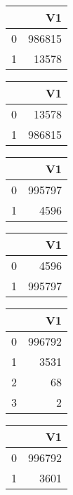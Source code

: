 \bigskip\bigskip
\centering
\begin{tabular}{rr}
  \hline
 & V1 \\ 
  \hline
0 & 986815 \\ 
  1 & 13578 \\ 
   \hline
\end{tabular}

\bigskip\bigskip
\centering
\begin{tabular}{rr}
  \hline
 & V1 \\ 
  \hline
0 & 13578 \\ 
  1 & 986815 \\ 
   \hline
\end{tabular}

\bigskip\bigskip
\centering
\begin{tabular}{rr}
  \hline
 & V1 \\ 
  \hline
0 & 995797 \\ 
  1 & 4596 \\ 
   \hline
\end{tabular}

\bigskip\bigskip
\centering
\begin{tabular}{rr}
  \hline
 & V1 \\ 
  \hline
0 & 4596 \\ 
  1 & 995797 \\ 
   \hline
\end{tabular}

\bigskip\bigskip
\centering
\begin{tabular}{rr}
  \hline
 & V1 \\ 
  \hline
0 & 996792 \\ 
  1 & 3531 \\ 
  2 &  68 \\ 
  3 &   2 \\ 
   \hline
\end{tabular}

\bigskip\bigskip
\centering
\begin{tabular}{rr}
  \hline
 & V1 \\ 
  \hline
0 & 996792 \\ 
  1 & 3601 \\ 
   \hline
\end{tabular}

